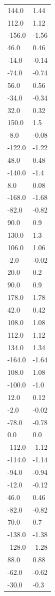 \begin{longtable}{ll}
144.0 & 1.44 \\
112.0 & 1.12 \\
-156.0 & -1.56 \\
46.0 & 0.46 \\
-14.0 & -0.14 \\
-74.0 & -0.74 \\
56.0 & 0.56 \\
-34.0 & -0.34 \\
32.0 & 0.32 \\
150.0 & 1.5 \\
-8.0 & -0.08 \\
-122.0 & -1.22 \\
48.0 & 0.48 \\
-140.0 & -1.4 \\
8.0 & 0.08 \\
-168.0 & -1.68 \\
-82.0 & -0.82 \\
90.0 & 0.9 \\
130.0 & 1.3 \\
106.0 & 1.06 \\
-2.0 & -0.02 \\
20.0 & 0.2 \\
90.0 & 0.9 \\
178.0 & 1.78 \\
42.0 & 0.42 \\
108.0 & 1.08 \\
112.0 & 1.12 \\
134.0 & 1.34 \\
-164.0 & -1.64 \\
108.0 & 1.08 \\
-100.0 & -1.0 \\
12.0 & 0.12 \\
-2.0 & -0.02 \\
-78.0 & -0.78 \\
0.0 & 0.0 \\
-112.0 & -1.12 \\
-114.0 & -1.14 \\
-94.0 & -0.94 \\
-12.0 & -0.12 \\
46.0 & 0.46 \\
-82.0 & -0.82 \\
70.0 & 0.7 \\
-138.0 & -1.38 \\
-128.0 & -1.28 \\
88.0 & 0.88 \\
-62.0 & -0.62 \\
-30.0 & -0.3 \\

\end{longtable}
